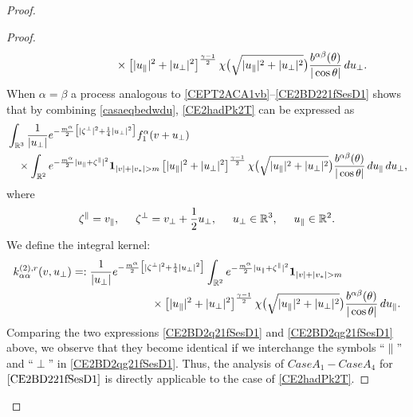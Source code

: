 \documentclass[reqno]{amsart}
\numberwithin{equation}{section}
\numberwithin{equation}{section}
\begin{document}
\begin{proof}
\begin{proof}
\begin{align}
				&\hspace{2.5cm}\times  \left[|u_{\parallel}|^2 + |u_{\perp}|^2\right]^{\frac{\gamma - 1}{2}} \chi\big(\sqrt{|u_{\parallel}|^2 + |u_{\perp}|^2}\big) \frac{b^{ \alpha \beta}(\theta)}{|\cos \theta|} \, du_{\perp}. \notag 
			\end{align}
		 When $\alpha=\beta$ a process analogous to \eqref{CEPT2ACA1vb}--\eqref{CE2BD221fSesD1} shows that‌  ‌by combining \eqref{casaeqbedwdu}, \eqref{CE2hadPk2T} can be expressed as
			\begin{align}
				& \int_{\mathbb{R}^3} \frac{1}{|u_{\perp}|} e^{-\frac{m^\alpha}{2}\big[|\zeta^{\perp}|^2+\frac{1}{4}|u_{\perp}|^2\big]} f^\alpha_1(v + u_{\perp}) \notag\\
				&\quad \times \int_{\mathbb{R}^2} e^{-\frac{m^\alpha}{2}|u_{\parallel} + \zeta^{\parallel}|^2} \mathbf{1}_{|v|+|v_*|>m}\left[|u_{\parallel}|^2 + |u_{\perp}|^2\right]^{\frac{\gamma - 1}{2}} \chi\big(\sqrt{|u_{\parallel}|^2 + |u_{\perp}|^2}\big) \frac{b^{ \alpha \beta}(\theta)}{|\cos \theta|} \,  du_{\parallel}\,du_{\perp},\label{CE2BD2qg21fSesD1}
			\end{align}
			where 
			\begin{equation*}
				\zeta^{\parallel}=v_{\parallel},\hspace{0.5cm}\zeta^{\perp}=v_{\perp}+\frac{1}{2}u_{\perp},\hspace{0.5cm}u_{\perp}\in \mathbb{R}^3,\hspace{0.5cm}u_{\parallel}\in \mathbb{R}^2.
			\end{equation*}
			We define the integral kernel:
			\begin{align}
				k_{\alpha \alpha}^{(2),r}(v,u_{\perp})	&=: \frac{1}{|u_{\perp}|} e^{-\frac{m^\alpha}{2}\big[|\zeta^{\perp}|^2+\frac{1}{4}|u_{\perp}|^2\big]} \int_{\mathbb{R}^2} e^{-\frac{m^\alpha}{2}|u_{\parallel} + \zeta^{\parallel}|^2} \mathbf{1}_{|v|+|v_*|>m}\notag\\
				&\hspace{2.5cm}\times  \left[|u_{\parallel}|^2 + |u_{\perp}|^2\right]^{\frac{\gamma - 1}{2}} \chi\big(\sqrt{|u_{\parallel}|^2 + |u_{\perp}|^2}\big) \frac{b^{ \alpha \beta}(\theta)}{|\cos \theta|} \, du_{\parallel}.  \label{deftmambddk2}
			\end{align}
			Comparing the two expressions \eqref{CE2BD2q21fSesD1} and \eqref{CE2BD2qg21fSesD1} above, we observe that they become identical if we interchange the symbols ``$\parallel$'' and ``$\perp$'' in \eqref{CE2BD2qg21fSesD1}. Thus, the analysis of $Case A_1-Case A_4$ for $\eqref{CE2BD221fSesD1}$ is directly applicable to the case of \eqref{CE2hadPk2T}.
			

\end{proof}
\end{proof}
\end{document}

